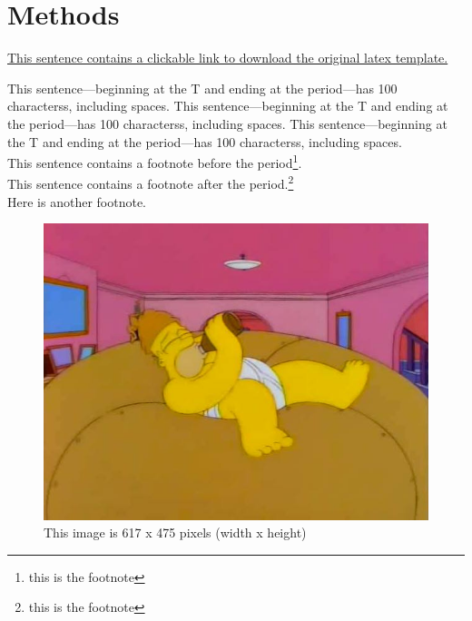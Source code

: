 \documentclass[utf8]{my_class_1_front_vanc}  %
\begin{document}
\section{Methods}\label{methods}

\href{https://www.frontiersin.org/design/zip/Frontiers_LaTeX_Templates.zip}{This sentence contains a clickable link to download the original latex template.}

This sentence---beginning at the T and ending at the period---has 100 characterss, including spaces.\cite{article}
This sentence---beginning at the T and ending at the period---has 100 characterss, including spaces.\cite{book}
This sentence---beginning at the T and ending at the period---has 100 characterss, including spaces.\\
This sentence contains a footnote before the period\footnote{this is the footnote}.\\
This sentence contains a footnote after the period.\footnote{this is the footnote}\\
Here is another footnote.


\begin{figure}[htbp]
        \begin{center}
        \includegraphics[width=\linewidth]{homer_giant_donut.jpg}
        \end{center}
    \caption{ This image is 617 x 475 pixels (width x height) }\label{fig:homer_giant_donut}
\end{figure}
\end{document}
